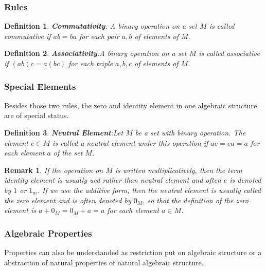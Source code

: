 \documentclass[a4paper]{article}
\newtheorem{definition}{Definition}[section]
\newtheorem{remark}{Remark}[section]
\begin{document}
	\subsubsection{Rules}

	\begin{definition}
		\textbf{Commutativity}: A binary operation on a set $M$ is called commutative if $ab = ba$ for
		each pair $a,b$ of elements of $M$.\cite{dixon2011algebra}
	\end{definition}

	\begin{definition}
		\textbf{Associativity}:A binary operation on a set $M$ is called associative if $(ab)c =
		a(bc)$ for each triple $a,b,c$ of elements of
		$M$.\cite{dixon2011algebra}
	\end{definition}

	\subsubsection{Special Elements}

	Besides those two rules, the zero and identity element in one algebraic
	structure are of special status.

	\begin{definition}
		\textbf{Neutral Element}:Let $M$ be a set with binary operation. The
		element $e \in M$ is called a neutral element under this operation if
		$ae = ea = a$ for each element $a$ of the set
		$M$.\cite{dixon2011algebra}
	\end{definition}

	\begin{remark}
		If the operation on $M$ is written multiplicatively, then the term
		\textit{identity element} is usually ued rather than neutral element
		and often $e$ is denoted by $1$ or $1_m$. If we use the additive form,
		then the neutral element is usually called the \textit{zero element}
		and is often denoted by $0_M$, so that the definition of the zero
		element is $ a + 0_M = 0_M + a = a$ for each element $a \in
		M$.\cite{dixon2011algebra}
	\end{remark}

	\subsubsection{Algebraic Properties}

	Properties can also be understanded as restriction put on algebraic
	structure or a abstraction of natural properties of natural algebraic
	structure.
\end{document}
